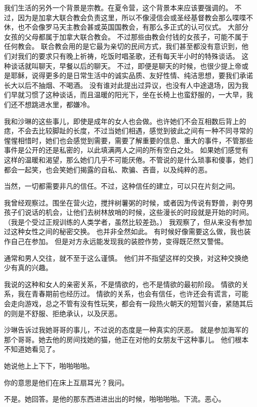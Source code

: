 \documentclass[UTF8]{ctexart}
\begin{document}
我们生活的另外一个背景是宗教。在夏令营，这个背景本来应该要强调的。
不过，因为是加拿大联合教会负责这里，所以不像浸信会或圣经基督教会那么喋喋不休，也不会像罗马天主教会甚或英国国教会，有那么多正式的认可仪式。
大部分女孩的父母都属于加拿大联合教会。
不过那些由教会付钱的女孩子，可能不属于任何教会。
联合教会用的是它最为亲切的民间方式，我们甚至都没有意识到，他们对我们的要求只有晚上祈祷，吃饭时唱圣歌，还有每天半小时的特殊谈话。
这种谈话就叫聊天，早餐以后的聊天。
不过，即便是聊天的时候，也很少提上帝或是耶稣，说得更多的是日常生活中的诚实品质、友好性情、纯洁思想，要我们承诺长大以后不抽烟、不喝酒。
没有谁对此提出过异议，也没有人中途退场，因为我们早就习惯了这种谈话，而且温暖的阳光下，坐在长椅上也蛮舒服的，一大早，我们还不想跳进水里，都嫌冷。

我和沙琳的这些事儿，即使是成年的女人也会做。也许她们不会互相数后背上的痣，不会去比较脚趾的长度，不过当她们相遇，感觉到彼此之间有一种不同寻常的惺惺相惜时，她们也会感觉到需要，需要了解重要的信息、重大的事件，不管那些事件是公开的还是私密的，以此填满两人之间的所有空白之处。
如果她们感觉有这样的温暖和渴望，那么她们几乎不可能厌倦。不管说的是什么琐事和傻事，她们都会一起笑，也会笑她们揭露的自私、欺骗、吝啬，以及纯粹的恶。

当然，一切都需要非凡的信任。不过，这种信任的建立，可以只在片刻之间。

我曾经观察过。围坐在营火边，搅拌树薯粥的时候，或者因为传说有野兽，剥夺男孩子们说话的机会，让他们去树林放哨的时候，这些漫长的时段就是开始的时间。
（我是个受过正规训练的人类学者，虽然比较差劲。）
我观察了，但从来没有参加过这种女性之间的秘密交换。
也并非全然如此。
有时候好像需要这么做，我也装作自己在参加。
但是对方永远能发现我的装腔作势，变得既茫然又警惕。

通常和男人交往，就不至于这么谨慎。
他们并不指望这样的交换，对这种交换绝少有真的兴趣。

我说的这种和女人的亲密关系，不是情欲的，也不是情欲的最初阶段。
情欲的关系，我在青春期前也经历过。
情欲的关系，也会有信任，也许还会有谎言，可能会走向游戏，总之不管有没有性玩笑，都会有一段热火朝天的短暂兴奋，紧随其后的则是不舒服、拒绝承认，以及厌恶。

沙琳告诉过我她哥哥的事儿，不过说的态度是一种真实的厌恶。
就是参加海军的那个哥哥。她去他的房间找她的猫，他正在对他的女朋友干这种事儿。
他们根本不知道她看见了。

她说他上上下下，啪啪啪啪。

你的意思是他们在床上互扇耳光？我问。

不是。她回答。是他的那东西进进出出的时候，啪啪啪啪。下流。恶心。
\end{document}
